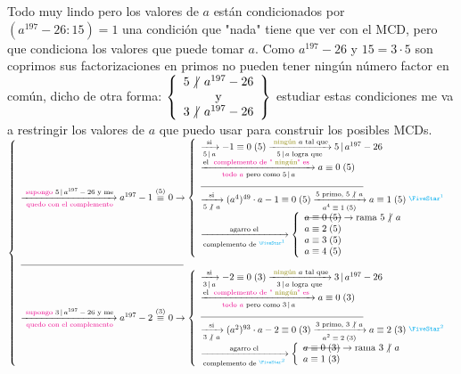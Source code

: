 \documentclass[12pt,a4paper, spanish]{article}
\begin{document}
Todo muy lindo pero los valores de $a$ están condicionados por  $(a^{197} - 26 : 15) = 1$
una condición que "nada" tiene que ver con el MCD, pero que condiciona los valores que puede
tomar $a$. Como $a^{197} - 26 $ y $15 = 3 \cdot 5$ son coprimos sus factorizaciones en primos
no pueden tener ningún número factor en común, dicho de otra forma:
$\llaves{c}{
		5 \noDivide  a^{197} - 26 \\
		\text{ y } \\
		3 \noDivide  a^{197} - 26
	}$ estudiar estas condiciones me va a restringir los valores de $a$ que puedo usar para construir
los posibles MCDs.\\

$\llave{l}{
		\flecha{\magenta{supongo} $5\divide a^{197} - 26$ y me}[\magenta{quedo con el complemento}]
		a^{197} - 1 \conga{5} 0
		\to
		\llave{l}{
			\flecha{si}[$5 \divide a$]
			\congruencia{-1}{0}{5}
			\flecha{\green{ningún} $a$ tal que}[$5 \divide a$ logra que] 5 \divide a^{197} - 26 \\
			\flecha{el \magenta{complemento de "\green{ningún}" es }}[\magenta{todo $a$} pero como $5\divide a$]
			\congruencia{a}{0}{5}\\
			\separadorCorto
			\flecha{si}[$5 \noDivide a$]
			\congruencia{(a^4)^{49} \cdot a - 1}{0}{5}
			\flecha{5 primo, $5\noDivide a$}[$\congruencia{a^4}{1}{5}$]
			\congruencia{a}{1}{5}\llamada1\\
			\flecha{agarro el}[complemento de $\llamada1$]
			\llave{l}{
				\hbox{\sout{$\congruencia{a}{0}{5}$}} \to \text{rama $5\noDivide a$} \\
				\congruencia{a}{2}{5} \\
				\congruencia{a}{3}{5} \\
				\congruencia{a}{4}{5} \\
			}
		}\\

		\separadorCorto

		\flecha{\magenta{supongo} $3\divide a^{197} - 26$ y me}[\magenta{quedo con el complemento}]
		a^{197} - 2 \conga{3} 0
		\to
		\llave{l}{
			\flecha{si}[$3 \divide a$]
			\congruencia{-2}{0}{3}
			\flecha{\green{ningún} $a$ tal que}[$3 \divide a$ logra que] 3 \divide a^{197} - 26 \\
			\flecha{el \magenta{complemento de "\green{ningún}" es }}[\magenta{todo $a$} pero como $3\divide a$]
			\congruencia{a}{0}{3}\\
			\separadorCorto
			\flecha{si}[$3 \noDivide a$]
			\congruencia{(a^2)^{93} \cdot a - 2}{0}{3}
			\flecha{3 primo, $3\noDivide a$}[$\congruencia{a^2}{2}{3}$]
			\congruencia{a}{2}{3}\llamada2\\
			\flecha{agarro el}[complemento de $\llamada2$]
			\llave{l}{
				\hbox{\sout{$\congruencia{a}{0}{3}$}} \to \text{rama $3\noDivide a$} \\
				\congruencia{a}{1}{3}
			}
		}\\

	}$\\
\end{document}
